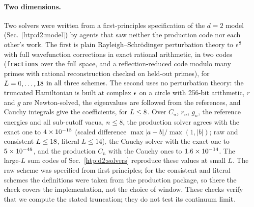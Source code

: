\paragraph{Two dimensions.}\label{htp:d2:checks}
Two solvers were written from a first-principles specification of the $d=2$ model (Sec.~\ref{htp:d2:model}) by agents that saw
neither the production code nor each other's work. The first is plain Rayleigh--Schr\"odinger perturbation theory to $\epsilon^8$
with full wavefunction corrections in exact rational arithmetic, in two codes (\texttt{fractions} over the full space, and a
reflection-reduced code modulo many primes with rational reconstruction checked on held-out primes), for
$L=0,\dots,18$ in all three schemes. The second uses no perturbation theory: the truncated Hamiltonian is built at
complex $\epsilon$ on a circle with 256-bit arithmetic, $r$ and $g$ are Newton-solved, the eigenvalues are followed from the
references, and Cauchy integrals give the coefficients, for $L\le8$. Over $C_n$, $r_n$, $g_n$, the reference
energies and all sub-cutoff vacua, $n\le8$, the production solver agrees with the exact one to $4\times10^{-13}$ (scaled
difference $\max|a-b|/\max(1,|b|)$; raw and consistent $L\le18$, literal $L\le14$), the Cauchy solver with the exact one
to $5\times10^{-46}$, and the production $C_n$ with the Cauchy ones to $1.6\times10^{-14}$. The large-$L$ sum codes of
Sec.~\ref{htp:d2:solvers} reproduce these values at small $L$. The raw scheme was specified from first principles; for the
consistent and literal schemes the definitions were taken from the production package, so there the check covers the
implementation, not the choice of window. These checks verify that we compute the stated truncation; they do not test its
continuum limit.
